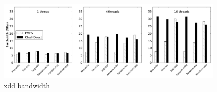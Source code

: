 
\begin{figure}
\vspace*{0mm}
 \includegraphics[width=\textwidth]{Graphs/xdd-quill.pdf}
 \vspace*{-5mm}\caption{\DAChell{} xdd bandwidth}
 \label{fig:quill-bandwidth}
\end{figure}

